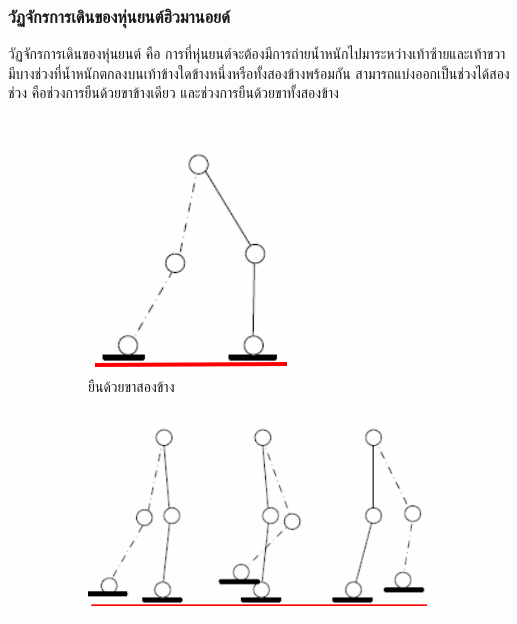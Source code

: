 \subsubsection{วัฏจักรการเดินของหุ่นยนต์ฮิวมานอยด์}
วัฏจักรการเดินของหุ่นยนต์ คือ การที่หุ่นยนต์จะต้องมีการถ่ายน้ำหนักไปมาระหว่างเท้าซ้ายและเท้าขวา
มีบางช่วงที่น้ำหนักตกลงบนเท้าข้างใดข้างหนึ่งหรือทั้งสองข้างพร้อมกัน สามารถแบ่งออกเป็นช่วงได้สองช่วง คือช่วงการยืนด้วยขาข้างเดียว
และช่วงการยืนด้วยขาทั้งสองข้าง
\begin{figure}[!ht]
	\centering
	\begin{subfigure}[b]{0.22\textwidth}
		\centering
		\includegraphics[width=\textwidth]{chapter2/images/doublesupport.png}
		\caption{ยืนด้วยขาสองข้าง}
		\label{fig:robot_walk_1}
	\end{subfigure}
	\hfill
	\begin{subfigure}[b]{0.45\textwidth}
		\centering
		\includegraphics[width=\textwidth]{chapter2/images/singlesupport.png}

\end{subfigure}
\end{figure}
